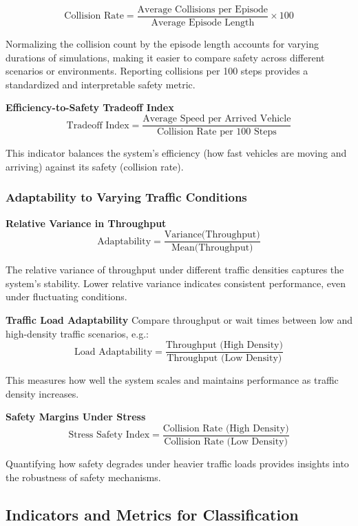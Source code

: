 \[
\text{Collision Rate} = \frac{\text{Average Collisions per Episode}}{\text{Average Episode Length}} \times 100
\]

Normalizing the collision count by the episode length accounts for varying durations of simulations, making it easier to compare safety across different scenarios or environments. Reporting collisions per 100 steps provides a standardized and interpretable safety metric.


\textbf{Efficiency-to-Safety Tradeoff Index}
\[
\text{Tradeoff Index} = \frac{\text{Average Speed per Arrived Vehicle}}{\text{Collision Rate per 100 Steps}}
\]

This indicator balances the system's efficiency (how fast vehicles are moving and arriving) against its safety (collision rate).




\subsubsection{Adaptability to Varying Traffic Conditions}

\textbf{Relative Variance in Throughput}
\[
\text{Adaptability} = \frac{\text{Variance(Throughput)}}{\text{Mean(Throughput)}}
\]

The relative variance of throughput under different traffic densities captures the system's stability. Lower relative variance indicates consistent performance, even under fluctuating conditions.



\textbf{Traffic Load Adaptability} 
Compare throughput or wait times between low and high-density traffic scenarios, e.g.:
\[
\text{Load Adaptability} = \frac{\text{Throughput (High Density)}}{\text{Throughput (Low Density)}}
\]

This measures how well the system scales and maintains performance as traffic density increases.


\textbf{Safety Margins Under Stress}
\[
\text{Stress Safety Index} = \frac{\text{Collision Rate (High Density)}}{\text{Collision Rate (Low Density)}}
\]

Quantifying how safety degrades under heavier traffic loads provides insights into the robustness of safety mechanisms.



\subsection*{Indicators and Metrics for Classification}

